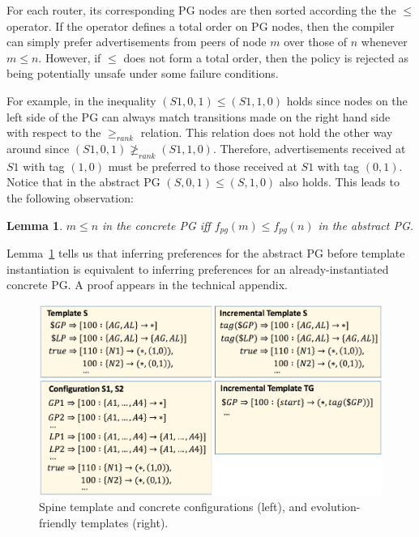 \documentclass[numbers, 10pt, preprint]{sigplanconf}
\newtheorem{lem}[thm]{Lemma}
\newcommand{\Appendix}{technical appendix\xspace}
\begin{document}
For each router, its corresponding PG nodes are then sorted according the the $\leq$ operator. If the operator defines a total order on PG nodes, then the compiler can simply prefer advertisements from peers of node $m$ over those of $n$ whenever $m \leq n$. However, if $\leq$ does not form a total order, then the policy is rejected as being potentially unsafe under some failure conditions.


%
For example, in the inequality $(S1,0,1) \leq (S1,1,0)$ holds since nodes on the left side of the PG can always match transitions made on the right hand side with respect to the $\geq_{rank}$ relation. This relation does not hold the other way around since $(S1,0,1) \ngeq_{rank} (S1,1,0)$. Therefore, advertisements received at $S1$ with tag $(1,0)$ must be preferred to those received at $S1$ with tag $(0,1)$.
%
Notice that in the abstract PG $(S,0,1) \leq (S,1,0)$ also holds. This leads to the following observation:

\begin{lem}
\label{lem:preference}
$m \leq n$ in the concrete PG iff $f_{pg}(m) \leq f_{pg}(n)$ in the abstract PG.
\end{lem}

Lemma~\ref{lem:preference} tells us that inferring preferences for the abstract PG before template instantiation is equivalent to inferring preferences for an already-instantiated concrete PG.  A proof appears in the \Appendix.


\begin{figure}[t!]
  \begin{center}
    \includegraphics[width=\columnwidth]{figures/configs}
  \end{center}
  \vspace{-1em}
  \caption{Spine template and concrete configurations (left), and evolution-friendly templates (right).}
  \label{fig:bgp-configs}
  \vspace{-.6em}
\end{figure}
\end{document}
